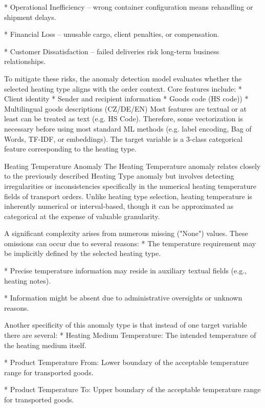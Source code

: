 * Operational Inefficiency – wrong container configuration means rehandling or shipment delays.

* Financial Loss – unusable cargo, client penalties, or compensation.

* Customer Dissatisfaction – failed deliveries risk long-term business relationships.
\enditems

To mitigate these risks, the anomaly detection model evaluates whether the selected heating type aligns with the order context. Core features include:
\begitems
* Client identity
* Sender and recipient information
* Goods code (HS code))
* Multilingual goods descriptions (CZ/DE/EN)
\enditems
Most features are textual or at least can be treated as text (e.g. HS Code). Therefore, some vectorization is necessary before using most standard ML methods (e.g. label encoding, Bag of Words, TF-IDF, or embeddings). The target variable is a 3-class categorical feature corresponding to the heating type.

\secc Heating Temperature Anomaly
The Heating Temperature anomaly relates closely to the previously described Heating Type anomaly but involves detecting irregularities or inconsistencies specifically in the numerical heating temperature fields of transport orders. Unlike heating type selection, heating temperature is inherently numerical or interval-based, though it can be approximated as categorical at the expense of valuable granularity.

A significant complexity arises from numerous missing ("None") values. These omissions can occur due to several reasons:
\begitems
* The temperature requirement may be implicitly defined by the selected heating type.

* Precise temperature information may reside in auxiliary textual fields (e.g., heating notes).

* Information might be absent due to administrative oversights or unknown reasons.
\enditems

Another specificity of this anomaly type is that instead of one target variable there are several:
\begitems
* Heating Medium Temperature: The intended temperature of the heating medium itself.

* Product Temperature From: Lower boundary of the acceptable temperature range for transported goods.

* Product Temperature To: Upper boundary of the acceptable temperature range for transported goods.
\enditems

